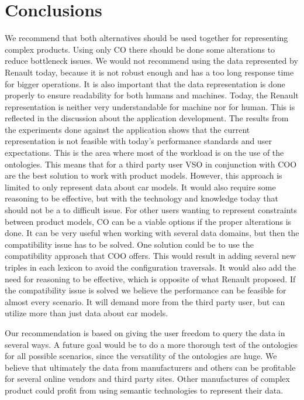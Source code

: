 \documentclass{llncs}
\begin{document}
\section{Conclusions}

We recommend that both alternatives should be used together for
representing complex products. 
Using only CO there should be done some alterations to reduce
bottleneck issues. We would not recommend using the data represented
by Renault today, because it is not robust enough and has a too long
response time for bigger operations.  It is also important that the
data representation is done properly to ensure readability for both
humans and machines.  Today, the Renault representation is neither
very understandable for machine nor for human. This is reflected in
the discussion about the application development.  The results from
the experiments done against the application shows that the current
representation is not feasible with today's performance standards and
user expectations. This is the area where most of the workload is on
the use of the ontologies.  This means that for a third party user VSO
in conjunction with COO are the best solution to work with product
models. However, this approach is limited to only represent data about
car models. It would also require some reasoning to be effective, but
with the technology and knowledge today that should not be a to
difficult issue. For other users wanting to represent constraints
between product models, CO can be a viable options if the proper
alterations is done. It can be very useful when working with several
data domains, but then the compatibility issue has to be solved.  One
solution could be to use the compatibility approach that COO
offers. This would result in adding several new triples in each
lexicon to avoid the configuration traversals.  It would also add the
need for reasoning to be effective, which is opposite of what Renault
proposed. If the compatibility issue is solved we believe the
performance can be feasible for almost every scenario. It will demand
more from the third party user, but can utilize more than just data
about car models. 

Our recommendation is based on giving the user freedom to query the
data in several ways.  A future goal would be to do a more thorough
test of the ontologies for all possible scenarios, since the
versatility of the ontologies are huge. We believe that ultimately the
data from manufacturers and others can be profitable for several
online vendors and third party sites. Other manufactures of complex
product could profit from using semantic
technologies to represent their data.
\end{document}
